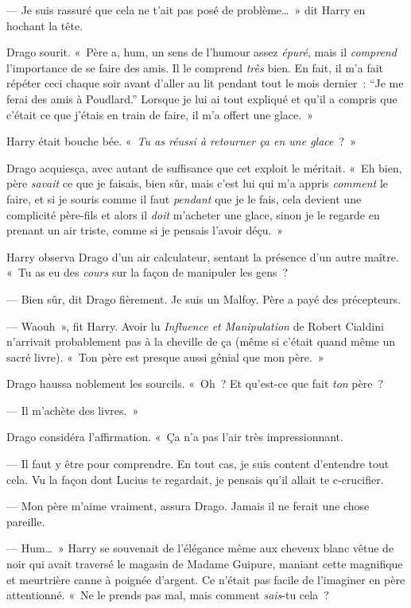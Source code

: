 --- Je suis rassuré que cela ne t'ait pas posé de problème…~» dit Harry en hochant la tête.

Drago sourit. «~Père a, hum, un sens de l'humour assez \emph{épuré}, mais il \emph{comprend} l'importance de se faire des amis.
Il le comprend \emph{très} bien.
En fait, il m'a fait répéter ceci chaque soir avant d'aller au lit pendant tout le mois dernier~: “Je me ferai des amis à Poudlard.”
Lorsque je lui ai tout expliqué et qu'il a compris que c'était ce que j'étais en train de faire, il m'a offert une glace.~»

Harry était bouche bée. «~\emph{Tu as réussi à retourner ça en une glace}~?~»

Drago acquiesça, avec autant de suffisance que cet exploit le méritait.
«~Eh bien, père \emph{savait} ce que je faisais, bien sûr, mais c'est lui qui m'a appris \emph{comment} le faire, et si je souris comme il faut \emph{pendant} que je le fais, cela devient une complicité père-fils et alors il \emph{doit} m'acheter une glace, sinon je le regarde en prenant un air triste, comme si je pensais l'avoir déçu.~»

Harry observa Drago d'un air calculateur, sentant la présence d'un autre maître.
«~Tu as eu des \emph{cours} sur la façon de manipuler les gens~?

--- Bien sûr, dit Drago fièrement. Je suis un Malfoy. Père a payé des précepteurs.

--- Waouh~», fit Harry. Avoir lu \emph{Influence et Manipulation} de Robert Cialdini n'arrivait probablement pas à la cheville de ça (même si c'était quand même un sacré livre).
«~Ton père est presque aussi génial que mon père.~»

Drago haussa noblement les sourcils.
«~Oh~? Et qu'est-ce que fait \emph{ton} père~?

--- Il m'achète des livres.~»

Drago considéra l'affirmation.  «~Ça n'a pas l'air très impressionnant.

--- Il faut y être pour comprendre.
En tout cas, je suis content d'entendre tout cela.
Vu la façon dont Lucius te regardait, je pensais qu'il allait te c-crucifier.

--- Mon père m'aime vraiment, assura Drago. Jamais il ne ferait une chose pareille.

--- Hum…~» Harry se souvenait
de l'élégance même aux cheveux blanc vêtue de noir qui avait traversé le magasin de Madame Guipure, maniant cette magnifique et meurtrière canne à poignée d'argent.
Ce n'était pas facile de l'imaginer en père attentionné.
«~Ne le prends pas mal, mais comment \emph{sais}-tu cela~?


